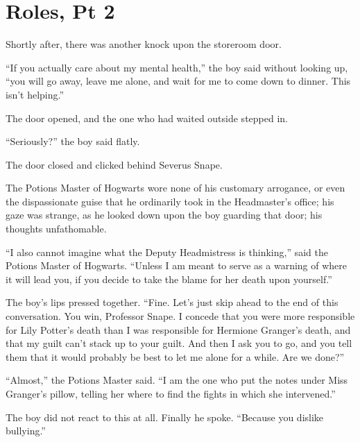 \chapter{Roles, Pt 2}\label{roles-pt-2}

Shortly after, there was another knock upon the storeroom door.

``If you actually care about my mental health,'' the boy said without
looking up, ``you will go away, leave me alone, and wait for me to come
down to dinner. This isn't helping.''

The door opened, and the one who had waited outside stepped in.

``Seriously?'' the boy said flatly.

The door closed and clicked behind Severus Snape.

The Potions Master of Hogwarts wore none of his customary arrogance, or
even the dispassionate guise that he ordinarily took in the Headmaster's
office; his gaze was strange, as he looked down upon the boy guarding
that door; his thoughts unfathomable.

``I also cannot imagine what the Deputy Headmistress is thinking,'' said
the Potions Master of Hogwarts. ``Unless I am meant to serve as a
warning of where it will lead you, if you decide to take the blame for
her death upon yourself.''

The boy's lips pressed together. ``Fine. Let's just skip ahead to the
end of this conversation. You win, Professor Snape. I concede that you
were more responsible for Lily Potter's death than I was responsible for
Hermione Granger's death, and that my guilt can't stack up to your
guilt. And then I ask you to go, and you tell them that it would
probably be best to let me alone for a while. Are we done?''

``Almost,'' the Potions Master said. ``I am the one who put the notes
under Miss Granger's pillow, telling her where to find the fights in
which she intervened.''

The boy did not react to this at all. Finally he spoke. ``Because you
dislike bullying.''

